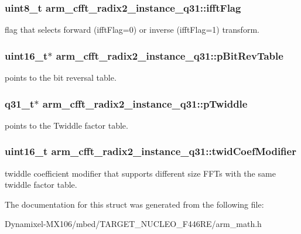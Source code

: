 \subsubsection[{\texorpdfstring{ifft\+Flag}{ifftFlag}}]{\setlength{\rightskip}{0pt plus 5cm}uint8\+\_\+t arm\+\_\+cfft\+\_\+radix2\+\_\+instance\+\_\+q31\+::ifft\+Flag}\hypertarget{structarm__cfft__radix2__instance__q31_a2607378ce64be16698bb8a3b1af8d3c8}{}\label{structarm__cfft__radix2__instance__q31_a2607378ce64be16698bb8a3b1af8d3c8}
flag that selects forward (ifft\+Flag=0) or inverse (ifft\+Flag=1) transform. 
\subsubsection[{\texorpdfstring{p\+Bit\+Rev\+Table}{pBitRevTable}}]{\setlength{\rightskip}{0pt plus 5cm}uint16\+\_\+t$\ast$ arm\+\_\+cfft\+\_\+radix2\+\_\+instance\+\_\+q31\+::p\+Bit\+Rev\+Table}\hypertarget{structarm__cfft__radix2__instance__q31_ada8e5264f4b22ff4c621817978994674}{}\label{structarm__cfft__radix2__instance__q31_ada8e5264f4b22ff4c621817978994674}
points to the bit reversal table. 
\subsubsection[{\texorpdfstring{p\+Twiddle}{pTwiddle}}]{\setlength{\rightskip}{0pt plus 5cm}q31\+\_\+t$\ast$ arm\+\_\+cfft\+\_\+radix2\+\_\+instance\+\_\+q31\+::p\+Twiddle}\hypertarget{structarm__cfft__radix2__instance__q31_a1d5bbe9a991e133f81652a77a7985d23}{}\label{structarm__cfft__radix2__instance__q31_a1d5bbe9a991e133f81652a77a7985d23}
points to the Twiddle factor table. 
\subsubsection[{\texorpdfstring{twid\+Coef\+Modifier}{twidCoefModifier}}]{\setlength{\rightskip}{0pt plus 5cm}uint16\+\_\+t arm\+\_\+cfft\+\_\+radix2\+\_\+instance\+\_\+q31\+::twid\+Coef\+Modifier}\hypertarget{structarm__cfft__radix2__instance__q31_ae63ca9193322cd477970c1d2086407d1}{}\label{structarm__cfft__radix2__instance__q31_ae63ca9193322cd477970c1d2086407d1}
twiddle coefficient modifier that supports different size F\+F\+Ts with the same twiddle factor table. 

The documentation for this struct was generated from the following file\+:\begin{DoxyCompactItemize}
\item 
Dynamixel-\/\+M\+X106/mbed/\+T\+A\+R\+G\+E\+T\+\_\+\+N\+U\+C\+L\+E\+O\+\_\+\+F446\+R\+E/arm\+\_\+math.\+h\end{DoxyCompactItemize}
